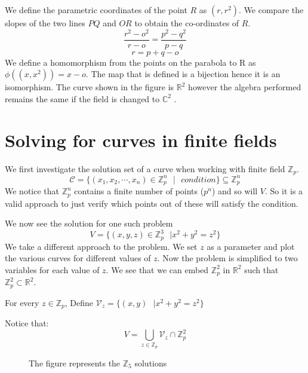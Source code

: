 \documentclass{report}
\begin{document}
We define the parametric coordinates of the point $R$ as $(r,r^2)$.
We compare the slopes of the two lines $PQ$ and $OR$ to obtain the co-ordinates of $R$.
\[\frac{r^2-o^2}{r-o} = \frac{p^2-q^2}{p-q}\]
\[r = p+q-o\]
We define a homomorphism from the points on the parabola to R as $\phi((x,x^2)) = x-o$.
The map that is defined is a bijection hence it is an isomorphism.
The curve shown in the figure is $\mathbb{R}^2$ however the algebra performed remains the same if the field is changed to $\mathbb{C}^2$ .

\section*{Solving for curves in finite fields}

We first investigate the solution set of a curve when working with finite field $\mathbb{Z}_p$.
\[\mathcal{C}  = \{(x_1,x_2,\cdots,x_n) \in \mathbb{Z}_p^n \text{ }|\text{ } condition \} \subseteq \mathbb{Z}_p^n\]
We notice that $\mathbb{Z}_p^n$ contains a finite number of points ($p^n$) and so will $V$.
So it is a valid approach to just verify which points out of these will satisfy the condition.
\vspace{1ex}

\noindent
We now see the solution for one such problem
\[V = \{(x,y,z) \in \mathbb{Z}_p^3 \text{ }| x^2+y^2 = z^2\}\]
We take a different approach to the problem.
We set $z$ as a parameter and plot the various curves for different values of $z$.
Now the problem is simplified to two variables for each value of $z$.
We see that we can embed $\mathbb{Z}_p^2 \text{ in } \mathbb{R}^2$ such that $\mathbb{Z}_p^2 \subset \mathbb{R}^2$.

For every $z \in \mathbb{Z}_p$, 
Define $\mathcal{V}_z = \{(x,y) \text{ }| x^2+y^2=z^2\}$

Notice that: 
\[V = \bigcup_{z \in \mathbb{Z}_p}\mathcal{V}_z\cap\mathbb{Z}_p^2 \]
\begin{figure}[H]
    \centering
    \caption{The figure represents the $\mathbb{Z}_5$ solutions}
\end{figure}
\end{document}
